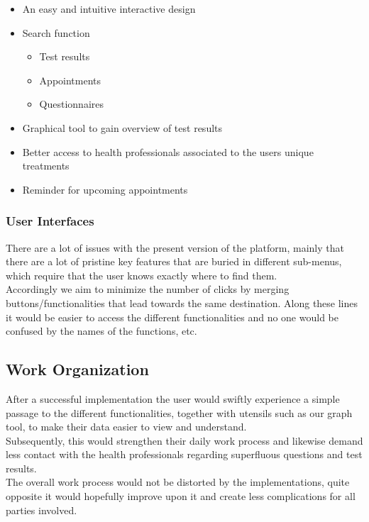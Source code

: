 \documentclass[a4paper,11pt]{article}
\begin{document}
\begin{itemize}
    \item An easy and intuitive interactive design
    \item Search function
        \begin{itemize}
            \item Test results
            \item Appointments
            \item Questionnaires
        \end{itemize}
    \item Graphical tool to gain overview of test results
    \item Better access to health professionals associated to the users unique treatments
    \item Reminder for upcoming appointments
\end{itemize}

\subsubsection{User Interfaces}
There are a lot of issues with the present version of the platform, mainly that there are a lot of pristine key features that are buried in different sub-menus, which require that the user knows exactly where to find them. \\

Accordingly we aim to minimize the number of clicks by merging buttons/functionalities that lead towards the same destination. Along these lines it would be easier to access the different functionalities and no one would be confused by the names of the functions, etc.\\

\subsection{Work Organization}
After a successful implementation the user would swiftly experience a simple passage to the different functionalities, together with utensils such as our graph tool, to make their data easier to view and understand.\\

Subsequently, this would strengthen their daily work process and likewise demand less contact with the health professionals regarding superfluous questions and test results.\\ 

The overall work process would not be distorted by the implementations, quite opposite it would hopefully improve upon it and create less complications for all parties involved.\\
\end{document}
